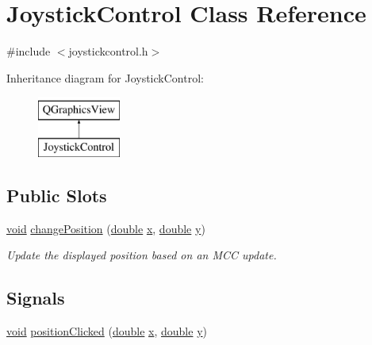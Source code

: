 \hypertarget{class_joystick_control}{\section{Joystick\-Control Class Reference}
\label{class_joystick_control}
}


{\ttfamily \#include $<$joystickcontrol.\-h$>$}

Inheritance diagram for Joystick\-Control\-:\begin{figure}[H]
\begin{center}
\leavevmode
\includegraphics[height=2.000000cm]{class_joystick_control}
\end{center}
\end{figure}
\subsection*{Public Slots}
\begin{DoxyCompactItemize}
\item 
\hyperlink{group___u_a_v_objects_plugin_ga444cf2ff3f0ecbe028adce838d373f5c}{void} \hyperlink{group___g_c_s_control_gadget_plugin_ga38032aee1ab31edefa56c0274624604c}{change\-Position} (\hyperlink{_super_l_u_support_8h_a8956b2b9f49bf918deed98379d159ca7}{double} \hyperlink{glext_8h_a1db9d104e3c2128177f26aff7b46982f}{x}, \hyperlink{_super_l_u_support_8h_a8956b2b9f49bf918deed98379d159ca7}{double} \hyperlink{glext_8h_a42315f3ed8fff752bb47fd782309fcfc}{y})
\begin{DoxyCompactList}\small\item\em Update the displayed position based on an M\-C\-C update. \end{DoxyCompactList}\end{DoxyCompactItemize}
\subsection*{Signals}
\begin{DoxyCompactItemize}
\item 
\hyperlink{group___u_a_v_objects_plugin_ga444cf2ff3f0ecbe028adce838d373f5c}{void} \hyperlink{class_joystick_control_aaafa394863c435c5d4c82f85cdd16b89}{position\-Clicked} (\hyperlink{_super_l_u_support_8h_a8956b2b9f49bf918deed98379d159ca7}{double} \hyperlink{glext_8h_a1db9d104e3c2128177f26aff7b46982f}{x}, \hyperlink{_super_l_u_support_8h_a8956b2b9f49bf918deed98379d159ca7}{double} \hyperlink{glext_8h_a42315f3ed8fff752bb47fd782309fcfc}{y})
\end{DoxyCompactItemize}
